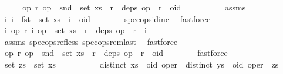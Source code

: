 \begin{isabellebody}
%
\isadelimproof
%
\endisadelimproof
%
\isatagproof
{}\isamarkupfalse%
\ {\isacharminus}\isanewline
\ \ \isamarkupfalse%
\ {\isachardoublequoteopen}{\isasymAnd}op{}\ r{\isachardot}\ op{}\ {\isasymin}\ snd\ {\isacharbackquote}\ set\ xs\ {\isasymLongrightarrow}\ r\ {\isasymin}\ deps\ op{}\ {\isasymLongrightarrow}\ r\ {\isacharless}\ oid{\isachardoublequoteclose}\isanewline
\ \ \isamarkupfalse%
\ {\isacharminus}\isanewline
\ \ \ \ \isamarkupfalse%
\ assms{\isacharparenleft}{}{\isacharparenright}\ \isamarkupfalse%
\ {\isachardoublequoteopen}{\isasymAnd}i{\isachardot}\ i\ {\isasymin}\ fst\ {\isacharbackquote}\ set\ xs\ {\isasymLongrightarrow}\ i\ {\isacharless}\ oid{\isachardoublequoteclose}\isanewline
\ \ \ \ \ \ \isamarkupfalse%
\ spec{\isacharunderscore}ops{\isacharunderscore}id{\isacharunderscore}inc\ \isamarkupfalse%
\ fastforce\isanewline
\ \ \ \ \isamarkupfalse%
\ \isamarkupfalse%
\ {\isachardoublequoteopen}{\isasymAnd}i{}\ op{}\ r{\isachardot}\ {\isacharparenleft}i{}{\isacharcomma}\ op{}{\isacharparenright}\ {\isasymin}\ set\ xs\ {\isasymLongrightarrow}\ r\ {\isasymin}\ deps\ op{}\ {\isasymLongrightarrow}\ r\ {\isacharless}\ i{}{\isachardoublequoteclose}\isanewline
\ \ \ \ \ \ \isamarkupfalse%
\ assms{\isacharparenleft}{}{\isacharparenright}\ spec{\isacharunderscore}ops{\isacharunderscore}ref{\isacharunderscore}less\ spec{\isacharunderscore}ops{\isacharunderscore}rem{\isacharunderscore}last\ \isamarkupfalse%
\ fastforce\isanewline
\ \ \ \ \isamarkupfalse%
\ \isamarkupfalse%
\ {\isachardoublequoteopen}{\isasymAnd}op{}\ r{\isachardot}\ op{}\ {\isasymin}\ snd\ {\isacharbackquote}\ set\ xs\ {\isasymLongrightarrow}\ r\ {\isasymin}\ deps\ op{}\ {\isasymLongrightarrow}\ r\ {\isacharless}\ oid{\isachardoublequoteclose}\isanewline
\ \ \ \ \ \ \isamarkupfalse%
\ fastforce\isanewline
\ \ \isamarkupfalse%
\isanewline
\ \ \isamarkupfalse%
\ \isamarkupfalse%
\ {\isachardoublequoteopen}set\ zs\ {\isasymsubseteq}\ set\ xs{\isachardoublequoteclose}\isanewline
\ \ \isamarkupfalse%
\ {\isacharminus}\isanewline
\ \ \ \ \isamarkupfalse%
\ {\isachardoublequoteopen}distinct\ {\isacharparenleft}xs\ {\isacharat}\ {\isacharbrackleft}{\isacharparenleft}oid{\isacharcomma}\ oper{\isacharparenright}{\isacharbrackright}{\isacharparenright}{\isachardoublequoteclose}\ \ {\isachardoublequoteopen}distinct\ {\isacharparenleft}ys\ {\isacharat}\ {\isacharbrackleft}{\isacharparenleft}oid{\isacharcomma}\ oper{\isacharparenright}{\isacharbrackright}\ {\isacharat}\ zs{\isacharparenright}{\isachardoublequoteclose}\isanewline

\end{isabellebody}
